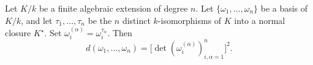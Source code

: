 Let $K/k$ be a finite algebraic extension of degree $n$. Let $\{\omega_1, \dots, \omega_n\}$ be a basis of $K/k$, and let $\tau_1, \dots, \tau_n$ be the $n$ distinct $k$-isomorphisms of $K$ into a normal closure $K^\star$. Set $\omega_i^{(\alpha)} = \omega_i^{\tau_\alpha}$. Then
$$d(\omega_1, \dots, \omega_n) = \big[\det(\omega_i^{(\alpha)})_{i,\alpha=1}^{n}\big]^2.$$
